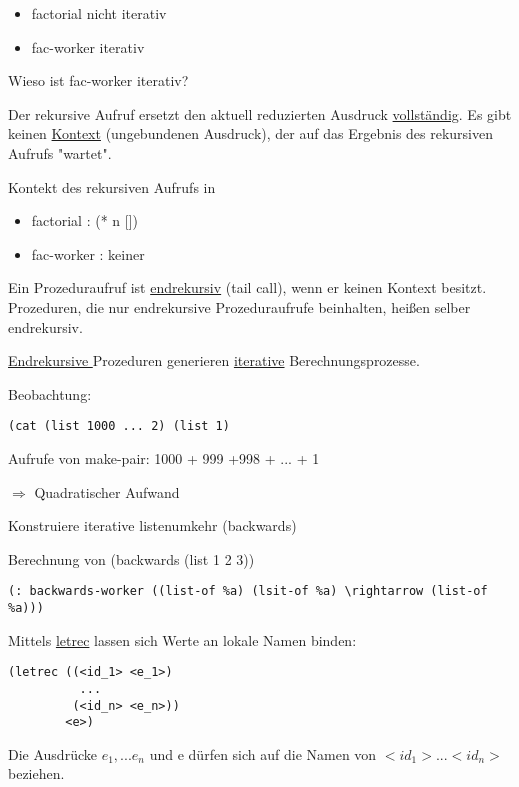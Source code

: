 \documentclass[a4paper, 20pt, openany]{book}
\begin{document}
\begin{itemize}
  \item factorial nicht iterativ 
  \item fac-worker iterativ
\end{itemize}

Wieso ist fac-worker iterativ?

Der rekursive Aufruf ersetzt den aktuell reduzierten Ausdruck \underline{vollständig}. Es gibt keinen \underline{Kontext} (ungebundenen Ausdruck), der auf das Ergebnis des rekursiven Aufrufs "wartet".

Kontekt des rekursiven Aufrufs in

\begin{itemize}
  \item factorial : (* n [])
  \item fac-worker : keiner
\end{itemize}

Ein Prozeduraufruf ist \underline{endrekursiv} (tail call), wenn er keinen Kontext besitzt. Prozeduren, die nur endrekursive Prozeduraufrufe beinhalten, heißen selber endrekursiv.

\underline{Endrekursive }Prozeduren generieren \underline{iterative} Berechnungsprozesse.

Beobachtung:

\begin{lstlisting}
(cat (list 1000 ... 2) (list 1)
\end{lstlisting}

Aufrufe von make-pair: 1000 + 999 +998 + ... + 1

$\Rightarrow$ Quadratischer Aufwand

Konstruiere iterative listenumkehr (backwards)

Berechnung von (backwards (list 1 2 3))

\begin{lstlisting}
(: backwards-worker ((list-of %a) (lsit-of %a) \rightarrow (list-of %a)))
\end{lstlisting}

Mittels \underline{letrec} lassen sich Werte an lokale Namen binden:

\begin{lstlisting}
(letrec ((<id_1> <e_1>)
          ...
         (<id_n> <e_n>))
        <e>)
\end{lstlisting}

Die Ausdrücke $e_1, ... e_n$ und e dürfen sich auf die Namen von $<id_1>...<id_n>$ beziehen.
\end{document}
